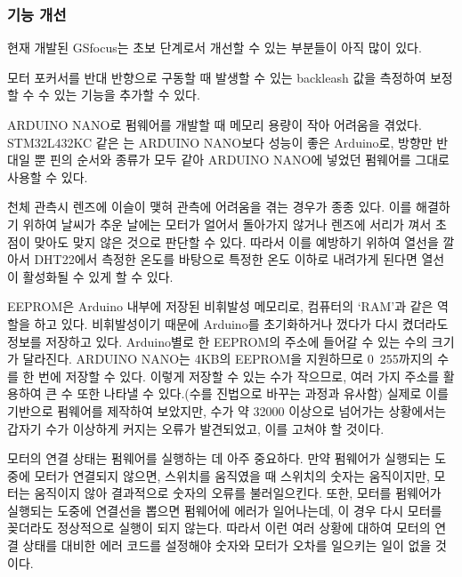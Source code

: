 \subsubsection{기능 개선}

현재 개발된 GSfocus는 초보 단계로서 개선할 수 있는 부분들이 아직 많이 있다. 

\begin{description}[font=$\bullet$~\normalfont\scshape\color{red!50!black}]
	\item [backleash 보정 기능 추가] 모터 포커서를 반대 반향으로 구동할 때 발생할 수 있는 backleash 값을 측정하여 보정할 수 수 있는 기능을 추가할 수 있다.
	\item [MCU 변경] ARDUINO NANO로 펌웨어를 개발할 때 메모리 용량이 작아 어려움을 겪었다. STM32L432KC 같은 는 ARDUINO NANO보다 성능이 좋은 Arduino로, 방향만 반대일 뿐 핀의 순서와 종류가 모두 같아 ARDUINO NANO에 넣었던 펌웨어를 그대로 사용할 수 있다.
	\item [Heating system 추가] 천체 관측시 렌즈에 이슬이 맺혀 관측에 어려움을 겪는 경우가 종종 있다. 이를 해결하기 위하여 날씨가 추운 날에는 모터가 얼어서 돌아가지 않거나 렌즈에 서리가 껴서 초점이 맞아도 맞지 않은 것으로 판단할 수 있다. 따라서 이를 예방하기 위하여 열선을 깔아서 DHT22에서 측정한 온도를 바탕으로 특정한 온도 이하로 내려가게 된다면 열선이 활성화될 수 있게 할 수 있다.
	\item [EEPROM 활용] EEPROM은 Arduino 내부에 저장된 비휘발성 메모리로, 컴퓨터의 ‘RAM’과 같은 역할을 하고 있다. 비휘발성이기 때문에 Arduino를 초기화하거나 껐다가 다시 켰더라도 정보를 저장하고 있다. 
	Arduino별로 한 EEPROM의 주소에 들어갈 수 있는 수의 크기가 달라진다. ARDUINO NANO는 4KB의 EEPROM을 지원하므로 0~255까지의 수를 한 번에 저장할 수 있다. 이렇게 저장할 수 있는 수가 작으므로, 여러 가지 주소를 활용하여 큰 수 또한 나타낼 수 있다.(수를 진법으로 바꾸는 과정과 유사함) 실제로 이를 기반으로 펌웨어를 제작하여 보았지만, 수가 약 32000 이상으로 넘어가는 상황에서는 갑자기 수가 이상하게 커지는 오류가 발견되었고, 이를 고쳐야 할 것이다.
	\item [모터 연결 상태 체크 기능 추가] 모터의 연결 상태는 펌웨어를 실행하는 데 아주 중요하다. 만약 펌웨어가 실행되는 도중에 모터가 연결되지 않으면, 스위치를 움직였을 때 스위치의 숫자는 움직이지만, 모터는 움직이지 않아 결과적으로 숫자의 오류를 불러일으킨다. 또한, 모터를 펌웨어가 실행되는 도중에 연결선을 뽑으면 펌웨어에 에러가 일어나는데, 이 경우 다시 모터를 꽂더라도 정상적으로 실행이 되지 않는다. 따라서 이런 여러 상황에 대하여 모터의 연결 상태를 대비한 에러 코드를 설정해야 숫자와 모터가 오차를 일으키는 일이 없을 것이다.
\end{description}
